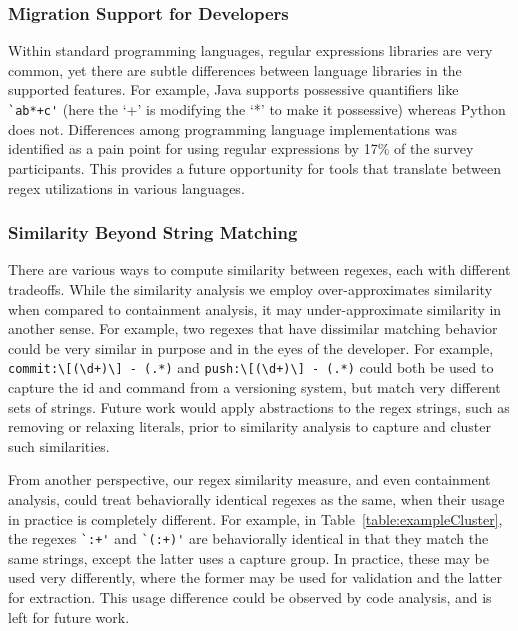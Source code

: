 \vspace{-2pt}
\subsubsection{Migration  Support for Developers}
Within standard programming languages, regular expressions libraries are very common, yet there are subtle  differences between language libraries in the supported features. For example, Java supports possessive quantifiers like \verb! `ab*+c'! (here the `+' is modifying the `*' to make it possessive) whereas Python does not. Differences among programming language implementations was identified as a pain point for using regular expressions by 17\% of the survey participants. This provides a future opportunity for tools that translate between regex utilizations in various languages.

\vspace{-2pt}
\subsubsection{Similarity Beyond String Matching}
There are various ways to compute similarity between regexes, each with different tradeoffs. 
While the similarity analysis we employ over-approximates similarity when compared to containment analysis, it may under-approximate similarity in another sense.
For example, two regexes that have dissimilar matching behavior could be very similar in purpose and in the eyes of the developer. For example, \verb!commit:\[(\d+)\] - (.*)! and \verb!push:\[(\d+)\] - (.*)! could both be used to  capture the id and command from a versioning system, but match very different sets of strings. Future work would apply abstractions to the regex strings, such as removing or relaxing literals, prior to similarity analysis to capture and cluster such similarities.

From another perspective, our regex similarity measure, and even containment analysis, could treat behaviorally identical regexes as the same, when  their usage in practice is completely different. For example, in Table~\ref{table:exampleCluster}, the regexes \verb!`:+'! and \verb!`(:+)'! are behaviorally identical in that they match the same strings, except the latter uses a capture group. In practice, these may be used very differently, where the former may be used for validation and the latter for extraction. This usage difference could be observed by code  analysis, and is left for future work.

